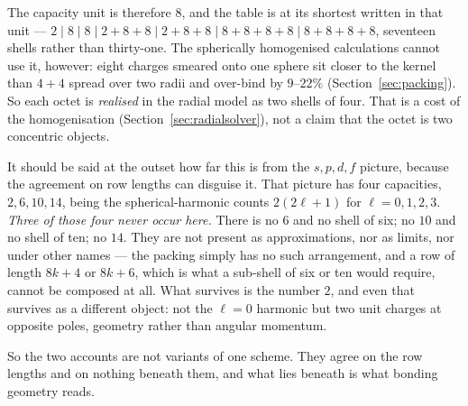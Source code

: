 \documentclass[11pt]{article}
\begin{document}
The capacity unit is therefore $8$, and the table is at its shortest written in that unit ---
$2\mid 8\mid 8\mid 2{+}8{+}8\mid 2{+}8{+}8\mid 8{+}8{+}8{+}8\mid 8{+}8{+}8{+}8$, seventeen
shells rather than thirty-one. The spherically homogenised calculations cannot use it, however:
eight charges smeared onto one sphere sit closer to the kernel than $4{+}4$ spread over two
radii and over-bind by $9$--$22\%$ (Section~\ref{sec:packing}). So each octet is \emph{realised}
in the radial model as two shells of four. That is a cost of the homogenisation
(Section~\ref{sec:radialsolver}), not a claim that the octet is two concentric objects.

It should be said at the outset how far this is from the $s,p,d,f$ picture, because the
agreement on row lengths can disguise it. That picture has four capacities, $2,6,10,14$,
being the spherical-harmonic counts $2(2\ell+1)$ for $\ell=0,1,2,3$. \emph{Three of those four
never occur here.} There is no $6$ and no shell of six; no $10$ and no shell of ten; no $14$.
They are not present as approximations, nor as limits, nor under other names --- the packing
simply has no such arrangement, and a row of length $8k{+}4$ or $8k{+}6$, which is what a
sub-shell of six or ten would require, cannot be composed at all. What survives is the
number $2$, and even that survives as a different object: not the $\ell=0$ harmonic but two
unit charges at opposite poles, geometry rather than angular momentum.

So the two accounts are not variants of one scheme. They agree on the row lengths and on
nothing beneath them, and what lies beneath is what bonding geometry reads.
\end{document}
